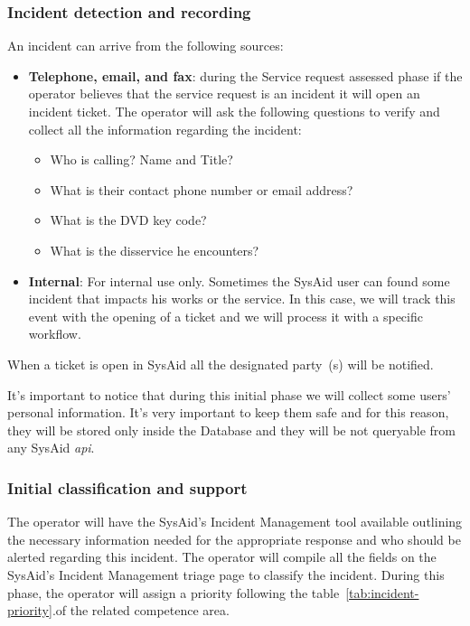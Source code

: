 \subsubsection{Incident detection and recording}
An incident can arrive from the following sources:
\begin{itemize}
	\item \textbf{Telephone, email, and fax}: during the Service request assessed phase if the operator believes that the service request is an incident it will open an incident ticket. The operator will ask the following questions to verify and collect all the information regarding the incident:
	\begin{itemize}
		\item Who is calling? Name and Title?
		\item What is their contact phone number or email address?
		\item What is the DVD key code?
		\item What is the disservice he encounters?
	\end{itemize}
	
	\item \textbf{Internal}: For internal use only. Sometimes the SysAid user can found some incident that impacts his works or the service. In this case, we will track this event with the opening of a ticket and we will process it with a specific workflow. 
\end{itemize}

When a ticket is open in SysAid all the designated party~(s) will be notified.

\begin{tcolorbox}
	It's important to notice that during this initial phase we will collect some users' personal information. It's very important to keep them safe and for this reason, they will be stored only inside the Database and they will be not queryable from any SysAid \textit{\gls{api}}.
\end{tcolorbox}

\subsubsection{Initial classification and support}
The operator will have the SysAid’s Incident Management tool available outlining the necessary information needed for the appropriate response and who should be alerted regarding this incident. The operator will compile all the fields on the SysAid’s Incident Management triage page to classify the incident. During this phase, the operator will assign a priority following the table~\ref{tab:incident-priority}.of the related competence area.


